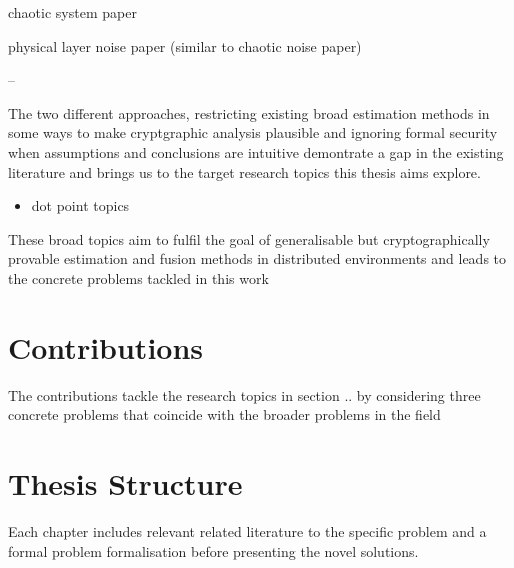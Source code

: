 chaotic system paper

physical layer noise paper (similar to chaotic noise paper)

--


The two different approaches, restricting existing broad estimation methods in some ways to make cryptgraphic analysis plausible and ignoring formal security when assumptions and conclusions are intuitive demontrate a gap in the existing literature and brings us to the target research topics this thesis aims explore.

\begin{itemize}
    \item dot point topics
\end{itemize}

These broad topics aim to fulfil the goal of generalisable but cryptographically provable estimation and fusion methods in distributed environments and leads to the concrete problems tackled in this work

% 
%                                                
%                                                
%                                                
% 
\section{Contributions}

The contributions tackle the research topics in section .. by considering three concrete problems that coincide with the broader problems in the field



% 
%                                                                    
%                                                                    
%                                                                    
% 
\section{Thesis Structure}

Each chapter includes relevant related literature to the specific problem and a formal problem formalisation before presenting the novel solutions.
